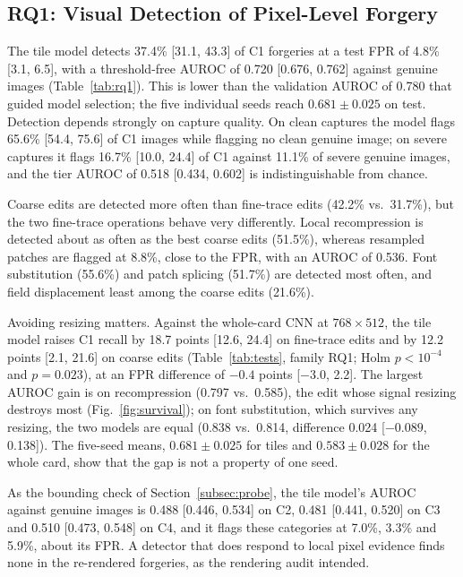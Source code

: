 \documentclass[conference]{IEEEtran}
\begin{document}




\subsection{RQ1: Visual Detection of Pixel-Level Forgery}
\label{subsec:res-rq1}

The tile model detects 37.4\% [31.1, 43.3] of C1 forgeries at a test
FPR of 4.8\% [3.1, 6.5], with a threshold-free AUROC of 0.720 [0.676,
0.762] against genuine images (Table~\ref{tab:rq1}). This is lower than
the validation AUROC of 0.780 that guided model selection; the five
individual seeds reach $0.681\pm0.025$ on test. Detection depends
strongly on capture quality. On clean captures the model flags 65.6\%
[54.4, 75.6] of C1 images while flagging no clean genuine image; on
severe captures it flags 16.7\% [10.0, 24.4] of C1 against 11.1\% of
severe genuine images, and the tier AUROC of 0.518 [0.434, 0.602] is
indistinguishable from chance.

Coarse edits are detected more often than fine-trace edits (42.2\% vs.\
31.7\%), but the two fine-trace operations behave very differently.
Local recompression is detected about as often as the best coarse
edits (51.5\%), whereas resampled patches are flagged at 8.8\%, close to the FPR, with
an AUROC of 0.536. Font substitution (55.6\%) and patch splicing
(51.7\%) are detected most often, and field displacement least among
the coarse edits (21.6\%).





Avoiding resizing matters. Against the whole-card CNN at
$768{\times}512$, the tile model raises C1 recall by 18.7 points
[12.6, 24.4] on fine-trace edits and by 12.2 points [2.1, 21.6] on
coarse edits (Table~\ref{tab:tests}, family RQ1; Holm $p<10^{-4}$ and
$p=0.023$), at an FPR difference of $-0.4$ points [$-3.0$, 2.2]. The
largest AUROC gain is on recompression (0.797 vs.\ 0.585), the edit
whose signal resizing destroys most (Fig.~\ref{fig:survival}); on font
substitution, which survives any resizing, the two models are equal
(0.838 vs.\ 0.814, difference 0.024 [$-0.089$, 0.138]). The five-seed
means, $0.681\pm0.025$ for tiles and $0.583\pm0.028$ for the whole card,
show that the gap is not a property of one seed.

As the bounding check of Section~\ref{subsec:probe}, the tile model's
AUROC against genuine images is 0.488 [0.446, 0.534] on C2, 0.481
[0.441, 0.520] on C3 and 0.510 [0.473, 0.548] on C4, and it flags these
categories at 7.0\%, 3.3\% and 5.9\%, about its FPR. A detector that does
respond to local pixel evidence finds none in the re-rendered
forgeries, as the rendering audit intended.
\end{document}
